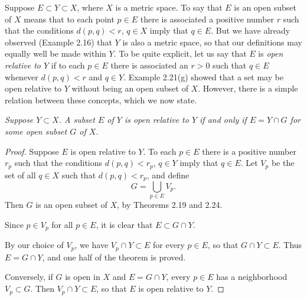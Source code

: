 Suppose $E \subset Y \subset X$, where $X$ is a metric space. To say that $E$
is an open subset of $X$ means that to each point $p \in E$ there is associated
a positive number $r$ such that the conditions $d(p,q) < r$, $q \in X$ imply
that $q \in E$. But we have already observed (Example 2.16) that $Y$ is also a
metric space, so that our definitions may equally well be made within $Y$. To
be quite explicit, let us say that $E$ is \emph{open relative to $Y$} if to
each $p \in E$ there is associated an $r > 0$ such that $q \in E$ whenever
$d(p,q) < r$ and $q \in Y$. Example 2.21(g) showed that a set may be open
relative to $Y$ without being an open subset of $X$. However, there is a simple
relation between these concepts, which we now state.

\emph{Suppose $Y \subset X$. A subset $E$ of $Y$ is open relative to $Y$ if and
only if $E = Y \cap G$ for some open subset $G$ of $X$.}

\begin{proof}
Suppose $E$ is open relative to $Y$. To each $p \in E$ there is a positive
number $r_p$ such that the conditions $d(p,q) < r_p$, $q \in Y$ imply that
$q \in E$. Let $V_p$ be the set of all $q \in X$ such that $d(p,q) < r_p$, and
define
\[ G = \bigcup_{p \in E} V_p. \]
Then $G$ is an open subset of $X$, by Theorems 2.19 and 2.24.

Since $p \in V_p$ for all $p \in E$, it is clear that $E \subset G \cap Y$.

By our choice of $V_p$, we have $V_p \cap Y \subset E$ for every $p \in E$, so
that $G \cap Y \subset E$. Thus $E = G \cap Y$, and one half of the theorem is
proved.

Conversely, if $G$ is open in $X$ and $E = G \cap Y$, every $p \in E$ has a
neighborhood $V_p \subset G$. Then $V_p \cap Y \subset E$, so that $E$ is open
relative to $Y$.
\end{proof}

\begin{center}
\end{center}
